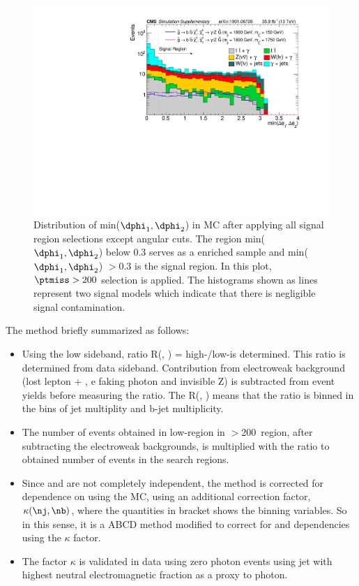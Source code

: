 \begin{figure}[h!]
\centering
\includegraphics[width=0.8\linewidth]{../Figures/Chap3/anaPublic/supp_Sim_mindPhi1dPhi2_T5bbbbZG}
\captionsetup{width=.9\linewidth}
\caption[Min($\dphi_{1},\dphi_{2}$) in MC]{Distribution of min($\dphi_{1},\dphi_{2}$) in MC after applying all signal region selections except angular cuts. The region min($\dphi_{1},\dphi_{2}$) below 0.3 serves as a \gjets enriched sample and min($\dphi_{1},\dphi_{2}$) $>0.3$ is the signal region. In this plot, $\ptmiss > 200$ \gev selection is applied. The histograms shown as lines represent two signal models which indicate that there is negligible signal contamination.}
\label{fig:supp_Sim_mindPhi1dPhi2_T5bbbbZG}
\end{figure}

The method briefly summarized as follows: 
\begin{itemize}
 \item Using the low \ptmiss sideband, ratio R(\nj, \nb) = high-\dphi/low-\dphi is determined. This ratio is determined from data sideband. Contribution from electroweak background (lost lepton + \tauh, e faking photon and invisible Z) is subtracted from event yields before measuring the ratio. The R(\nj, \nb) means that the ratio is binned in the bins of jet multiplity and b-jet multiplicity.
 \item The number of events obtained in low-\dphi region in \ptmiss$>$200~\gev region, after subtracting the electroweak backgrounds, is multiplied with the ratio to obtained number of events in the search regions. 
 \item Since \dphi and \ptmiss are not completely independent, the method is corrected for dependence on \ptmiss using the MC, using an additional correction factor, $\kappa(\nj, \nb)$, where the quantities in bracket shows the binning variables. So in this sense, it is a ABCD method modified to correct for \dphi and \ptmiss dependencies using the $\kappa$ factor.
 \item The factor $\kappa$ is validated in data using zero photon events using jet with highest neutral electromagnetic fraction as a proxy to photon.
\end{itemize}

